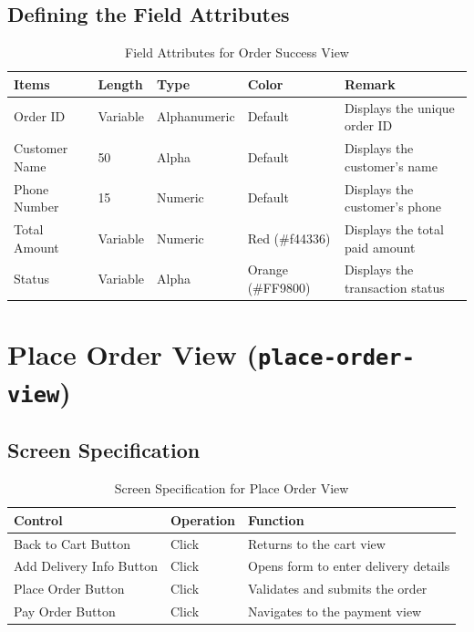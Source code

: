 \documentclass{article}
\begin{document}
\subsection{Defining the Field Attributes}
\begin{table}[h!]
\centering
\begin{tabularx}{\textwidth}{|l|l|l|l|X|}
\hline
\textbf{Items} & \textbf{Length} & \textbf{Type} & \textbf{Color} & \textbf{Remark} \\
\hline
Order ID & Variable & Alphanumeric & Default & Displays the unique order ID \\
\hline
Customer Name & 50 & Alpha & Default & Displays the customer's name \\
\hline
Phone Number & 15 & Numeric & Default & Displays the customer's phone \\
\hline
Total Amount & Variable & Numeric & Red (\#f44336) & Displays the total paid amount \\
\hline
Status & Variable & Alpha & Orange (\#FF9800) & Displays the transaction status \\
\hline
\end{tabularx}
\caption{Field Attributes for Order Success View}
\end{table}

\section{Place Order View (\texttt{place-order-view})}
\subsection{Screen Specification}
\begin{table}[h!]
\centering
\begin{tabularx}{\textwidth}{|l|l|X|}
\hline
\textbf{Control} & \textbf{Operation} & \textbf{Function} \\
\hline
Back to Cart Button & Click & Returns to the cart view \\
\hline
Add Delivery Info Button & Click & Opens form to enter delivery details \\
\hline
Place Order Button & Click & Validates and submits the order \\
\hline
Pay Order Button & Click & Navigates to the payment view \\
\hline
\end{tabularx}
\caption{Screen Specification for Place Order View}
\end{table}
\end{document}
